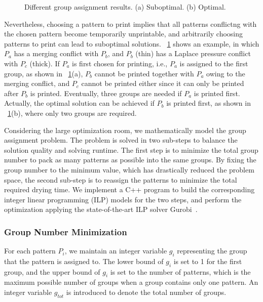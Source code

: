 \begin{figure}[t]
	\fontsize{14}{14}  \selectfont
	\centerline{\resizebox{8.5cm}{!}{}}
	\caption{Different group assignment results. (a) Suboptimal. (b) Optimal.}
	\label{fig:subopt}
	\normalsize
\end{figure}

Nevertheless, choosing a pattern to print implies that all patterns conflictng with the chosen pattern become temporarily unprintable,
and arbitrarily choosing patterns to print can lead to suboptimal solutions.
\figurename~\ref{fig:subopt} shows an example,
in which $P_a$ has a merging conflict with $P_b$,
and $P_b$ (thin) has a Laplace pressure conflict with $P_c$ (thick).
If $P_a$ is first chosen for printing,
i.e., $P_a$ is assigned to the first group,
as shown in \figurename~\ref{fig:subopt}(a),
$P_b$ cannot be printed together with $P_a$ owing to the merging conflict,
and $P_c$ cannot be printed either since it can only be printed after $P_b$ is printed.
Eventually, three groups are needed if $P_a$ is printed first.
Actually, the optimal solution can be achieved if $P_b$ is printed first,
as shown in \figurename~\ref{fig:subopt}(b),
where only two groups are required.

Considering the large optimization room,
we mathematically model the group assignment problem.
The problem is solved in two sub-steps to balance the solution quality and solving runtime.
The first step is to minimize the total group number to pack as many patterns as possible into the same groups.
By fixing the group number to the minimum value,
which has drastically reduced the problem space,
the second sub-step is to reassign the patterns to minimize the total required drying time.
We implement a C++ program to build the corresponding integer linear programming (ILP)
models for the two steps,
and perform the optimization applying the state-of-the-art ILP solver Gurobi~\cite{gurobi}.

\subsubsection{Group Number Minimization}\label{gnm}

For each pattern $P_i$,
we maintain an integer variable $g_i$ representing the group that the pattern is assigned to.
The lower bound of $g_i$ is set to 1 for the first group,
and the upper bound of $g_i$ is set to the number of patterns,
which is the maximum possible number of groups when a group contains only one pattern. 
An integer variable $g_{tot}$ is introduced to denote the total number of groups.

